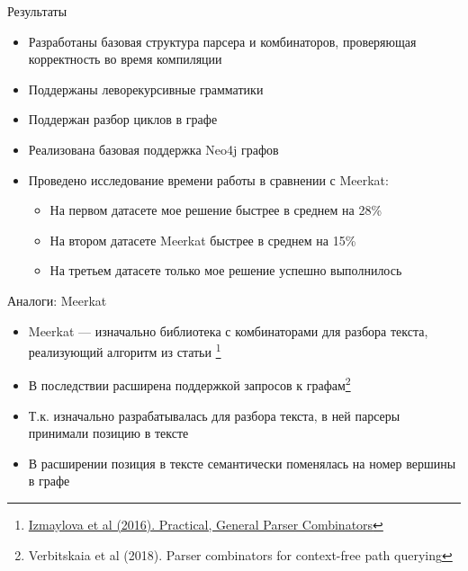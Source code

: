 \documentclass[aspectratio=169]{beamer}
\begin{document}

\begin{frame}{Результаты}
  \begin{itemize}
    \item Разработаны базовая структура парсера и комбинаторов, проверяющая корректность во время компиляции
    \item Поддержаны леворекурсивные грамматики
    \item Поддержан разбор циклов в графе
    \item Реализована базовая поддержка Neo4j графов
    \item Проведено исследование времени работы в сравнении с Meerkat:
          \begin{itemize}
            \item На первом датасете мое решение быстрее в среднем на 28\%
            \item На втором датасете Meerkat быстрее в среднем на 15\%
            \item На третьем датасете только мое решение успешно выполнилось
          \end{itemize}
  \end{itemize}
\end{frame}


\appendix


\begin{frame}{Аналоги: Meerkat}
  \begin{itemize}
    \item Meerkat --- изначально библиотека с комбинаторами для разбора текста, реализующий алгоритм из статьи \footnote[1]{\href{https://dl.acm.org/doi/10.1145/2847538.2847539}
            {Izmaylova et al (2016). Practical, General Parser Combinators}}
    \item В последствии расширена поддержкой запросов к графам\footnote[2]{Verbitskaia et al (2018). Parser combinators for context-free path querying}
    \item Т.к. изначально разрабатывалась для разбора текста, в ней парсеры принимали позицию в тексте
    \item В расширении позиция в тексте семантически поменялась на номер вершины в графе
  \end{itemize}
\end{frame}
\end{document}

